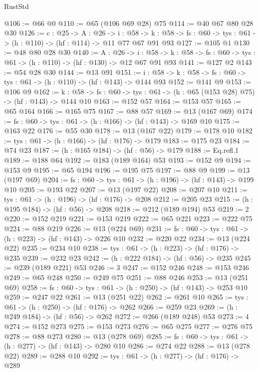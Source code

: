 \begin{lexlean}{RustStd}
\begin{coremodule}
@106 := @66 @0
@110 := @65 (@106 @69 @28) @75
@114 := @40 @67 @80 @28 @30
@126 := {c : @25} ->
  {A : @26} ->
  {i : @58} ->
  {k : @58} -> {fs : @60} -> {tys : @61} -> (h : @110) -> (hf : @114) -> @11 @77 @67 @91 @93
@127 := @105 @1
@130 := @48 @80 @28 @30
@140 := {A : @26} ->
  {i : @58} ->
  {k : @58} -> {fs : @60} -> {tys : @61} -> (h : @110) -> (hf : @130) -> @12 @67 @91 @93
@141 := @127 @2
@143 := @54 @28 @30
@144 := @13 @91
@151 := {i : @58} -> {k : @58} -> {fs : @60} -> {tys : @61} -> (h : @110) -> (hf : @143) -> @144 @93
@152 := @141 @9
@153 := @106 @9
@162 := {k : @58} ->
  {fs : @60} -> {tys : @61} -> (h : @65 (@153 @28) @75) -> (hf : @143) -> @144 @10
@163 := @152 @57
@164 := @153 @57
@165 := @65 @164
@166 := @165 @75
@167 := @88 @57
@169 := @13 (@167 @69)
@174 := {fs : @60} -> {tys : @61} -> (h : @166) -> (hf : @143) -> @169 @10
@175 := @163 @22
@176 := @55 @30
@178 := @13 (@167 @22)
@179 := @178 @10
@182 := {tys : @61} -> (h : @166) -> (hf : @176) -> @179
@183 := @175 @23
@184 := @74 @23
@187 := (h : @165 @184) -> (hf : @56) -> @179
@188 := Eq.refl.{1}
@189 := @188 @64
@192 := @183 (@189 @164) @53
@193 := @152 @9
@194 := @153 @9
@195 := @65 @194
@196 := @195 @75
@197 := @88 @9
@199 := @13 (@197 @69)
@204 := {fs : @60} -> {tys : @61} -> (h : @196) -> (hf : @143) -> @199 @10
@205 := @193 @22
@207 := @13 (@197 @22)
@208 := @207 @10
@211 := {tys : @61} -> (h : @196) -> (hf : @176) -> @208
@212 := @205 @23
@215 := (h : @195 @184) -> (hf : @56) -> @208
@218 := @212 (@189 @194) @53
@219 := 2
@220 := @152 @219
@221 := @153 @219
@222 := @65 @221
@223 := @222 @75
@224 := @88 @219
@226 := @13 (@224 @69)
@231 := {fs : @60} -> {tys : @61} -> (h : @223) -> (hf : @143) -> @226 @10
@232 := @220 @22
@234 := @13 (@224 @22)
@235 := @234 @10
@238 := {tys : @61} -> (h : @223) -> (hf : @176) -> @235
@239 := @232 @23
@242 := (h : @222 @184) -> (hf : @56) -> @235
@245 := @239 (@189 @221) @53
@246 := 3
@247 := @152 @246
@248 := @153 @246
@249 := @65 @248
@250 := @249 @75
@251 := @88 @246
@253 := @13 (@251 @69)
@258 := {fs : @60} -> {tys : @61} -> (h : @250) -> (hf : @143) -> @253 @10
@259 := @247 @22
@261 := @13 (@251 @22)
@262 := @261 @10
@265 := {tys : @61} -> (h : @250) -> (hf : @176) -> @262
@266 := @259 @23
@269 := (h : @249 @184) -> (hf : @56) -> @262
@272 := @266 (@189 @248) @53
@273 := 4
@274 := @152 @273
@275 := @153 @273
@276 := @65 @275
@277 := @276 @75
@278 := @88 @273
@280 := @13 (@278 @69)
@285 := {fs : @60} -> {tys : @61} -> (h : @277) -> (hf : @143) -> @280 @10
@286 := @274 @22
@288 := @13 (@278 @22)
@289 := @288 @10
@292 := {tys : @61} -> (h : @277) -> (hf : @176) -> @289

\end{coremodule}
\end{lexlean}
